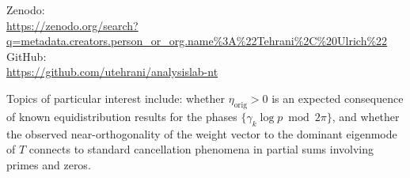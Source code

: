 \documentclass[11pt]{article}
\newcommand{\etaorig}{\eta_{\mathrm{orig}}}
\begin{document}
{\raggedright
Zenodo:\\
\url{https://zenodo.org/search?q=metadata.creators.person_or_org.name\%3A\%22Tehrani\%2C\%20Ulrich\%22}\\
GitHub:\\
\url{https://github.com/utehrani/analysislab-nt}
\par}

Topics of particular interest include: whether $\etaorig>0$ is an
expected consequence of known equidistribution results for the phases
$\{\gamma_k\log p \bmod 2\pi\}$, and whether the observed
near-orthogonality of the weight vector to the dominant eigenmode of
$T$ connects to standard cancellation phenomena in partial sums
involving primes and zeros.

\end{document}
